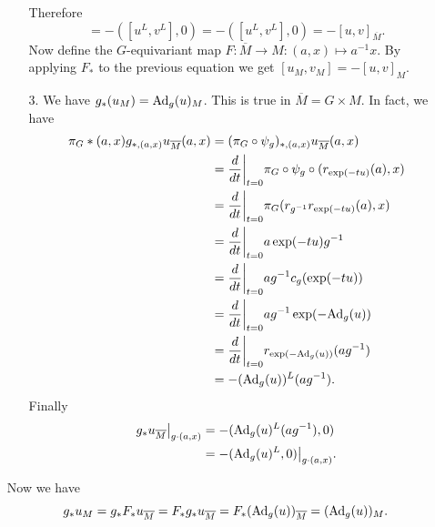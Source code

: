 \begin{itemize}
\begin{itemize}
\begin{equation}
            \end{equation}
            Therefore
            \begin{equation}
                [u_{\overline{M}},v_{\overline{M}}]=
                -([u^L,v^L],0)=
                -([u^L,v^L],0)=
                -[u,v]_{\overline{M}}.
            \end{equation}
            Now define the $G$-equivariant map $F:\overline{M}\to M:(a,x)\mapsto a^{-1}x$. By applying $F_*$ to the previous 
            equation we get $[u_M,v_M]=-[u,v]_M$.
            \item[3.] We have $g_*(u_M)=\text{Ad}_g(u)_M$. This is true in $\overline{M}=G\times M$. In fact, we have 
            \begin{equation}
                \begin{split}
                    \pi_G*(a,x)g_{*,(a,x)}u_{\overline{M}}(a,x)
                    &=(\pi_G\circ\psi_g)_{*,(a,x)}u_{\overline{M}}(a,x)\\
                    &=\frac{d}{dt}\bigg|_{t=0}\pi_G\circ\psi_g\circ(r_{\exp(-tu)}(a),x)\\
                    &=\frac{d}{dt}\bigg|_{t=0}\pi_G(r_{g^{-1}}r_{\exp(-tu)}(a),x)\\
                    &=\frac{d}{dt}\bigg|_{t=0}a\exp(-tu)g^{-1}\\
                    &=\frac{d}{dt}\bigg|_{t=0}ag^{-1}c_g(\exp(-tu))\\
                    &=\frac{d}{dt}\bigg|_{t=0}ag^{-1}\exp(-\text{Ad}_g(u))\\
                    &=\frac{d}{dt}\bigg|_{t=0}r_{\exp(-\text{Ad}_g(u))}(ag^{-1})\\
                    &=-(\text{Ad}_g(u))^L(ag^{-1}).
                \end{split}
            \end{equation}
            Finally 
            \begin{equation}
                \begin{split}
                    g_*u_{\overline{M}}\big|_{g\cdot(a,x)}&=-(\text{Ad}_g(u)^L(ag^{-1}),0)\\
                    &=-(\text{Ad}_g(u)^L,0)\big|_{g\cdot(a,x)}.
                \end{split}
            \end{equation}
        \end{itemize}
        Now we have 
        \begin{equation}
            g_*u_M=g_*F_*u_{\overline{M}}=F_*g_*u_{\overline{M}}=F_*(\Ad_g(u))_{\overline{M}}=(\Ad_g(u))_M.

\end{equation}
\end{itemize}
